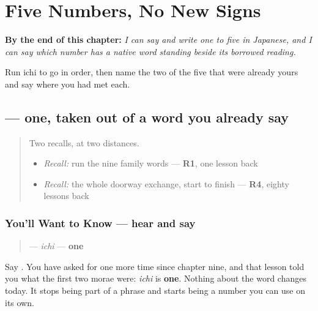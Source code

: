 
\chapter{Five Numbers, No New Signs}
\label{ch:ja-numbers-one-to-five}

\begin{chapteropening}
\textbf{By the end of this chapter:} \emph{I can say and write one to five in Japanese, and I can say which number has a native word standing beside its borrowed reading.}

Run ichi to go in order, then name the two of the five that were already yours and say where you had met each.
\end{chapteropening}

\section[\texorpdfstring{\ja{いち} (ichi)}{いち (ichi)}]{ — one, taken out of a word you already say}

\label{lesson:JA-C14-ichi}



\begin{quote}
Two recalls, at two distances.

\begin{itemize}
\raggedright
  \item \emph{Recall:} run the nine family words — \textbf{R1}, one lesson back
  \item \emph{Recall:} the whole doorway exchange, start to finish — \textbf{R4}, eighty lessons back
\end{itemize}
\end{quote}

\subsection*{You'll Want to Know — hear and say}
\begin{quote}
\textbf{} — \emph{ichi} — \textbf{one}
\end{quote}

Say \textbf{}. You have asked for one more time since chapter nine, and that lesson told you what the first two morae were: \emph{ichi} is \textbf{one}. Nothing about the word changes today. It stops being part of a phrase and starts being a number you can use on its own.

